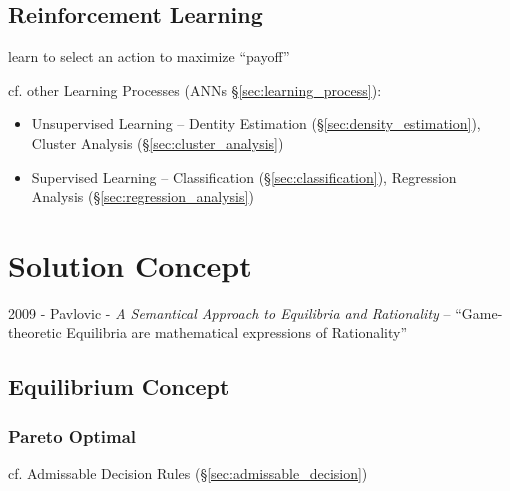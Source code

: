 \subsection{Reinforcement Learning}\label{sec:reinforcement_learning}

learn to select an action to maximize ``payoff''

cf. other Learning Processes (ANNs \S\ref{sec:learning_process}):
\begin{itemize}
  \item Unsupervised Learning -- Dentity Estimation
    (\S\ref{sec:density_estimation}), Cluster Analysis
    (\S\ref{sec:cluster_analysis})
  \item Supervised Learning -- Classification (\S\ref{sec:classification}),
    Regression Analysis (\S\ref{sec:regression_analysis})
\end{itemize}



\section{Solution Concept}\label{sec:solution_concept}

2009 - Pavlovic - \emph{A Semantical Approach to Equilibria and Rationality} --
``Game-theoretic Equilibria are mathematical expressions of Rationality''



\subsection{Equilibrium Concept}\label{sec:equilibrium_concept}

\subsubsection{Pareto Optimal}\label{sec:pareto_optimal}

\fist cf. Admissable Decision Rules (\S\ref{sec:admissable_decision})



